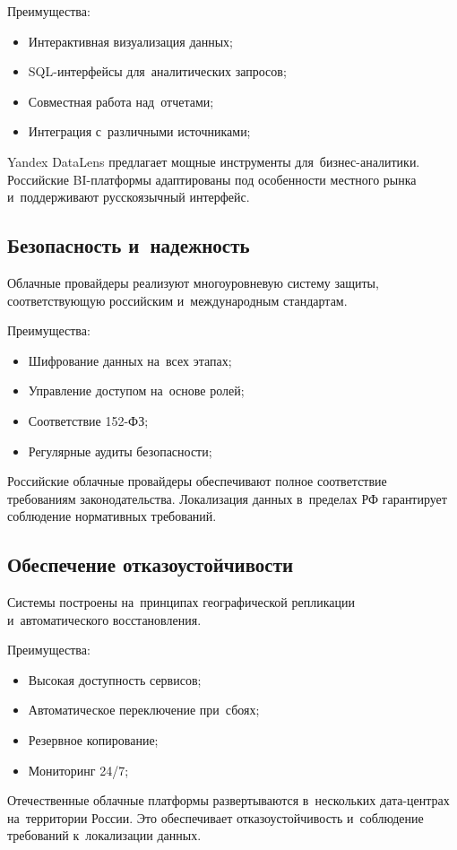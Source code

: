 \documentclass{ou}
\begin{document}
Преимущества:
\begin{itemize}[label=-, leftmargin=0em, itemindent=3.35em, nosep]
\item Интерактивная визуализация данных;
\item SQL-интерфейсы для~аналитических запросов;
\item Совместная работа над~отчетами;
\item Интеграция с~различными источниками;
\end{itemize}

Yandex DataLens предлагает мощные инструменты для~бизнес-аналитики. Российские BI-платформы адаптированы под особенности местного рынка и~поддерживают русскоязычный интерфейс.
\subsection{Безопасность и~надежность}
Облачные провайдеры реализуют многоуровневую систему защиты, соответствующую российским и~международным стандартам.

Преимущества:
\begin{itemize}[label=-, leftmargin=0em, itemindent=3.35em, nosep]
\item Шифрование данных на~всех этапах;
\item Управление доступом на~основе ролей;
\item Соответствие 152-ФЗ;
\item Регулярные аудиты безопасности;
\end{itemize}

Российские облачные провайдеры обеспечивают полное соответствие требованиям законодательства. Локализация данных в~пределах РФ гарантирует соблюдение нормативных требований.
\subsection{Обеспечение отказоустойчивости}
Системы построены на~принципах географической репликации и~автоматического восстановления.

Преимущества:
\begin{itemize}[label=-, leftmargin=0em, itemindent=3.35em, nosep]
\item Высокая доступность сервисов;
\item Автоматическое переключение при~сбоях;
\item Резервное копирование;
\item Мониторинг 24/7;
\end{itemize}

Отечественные облачные платформы развертываются в~нескольких дата-центрах на~территории России. Это обеспечивает отказоустойчивость и~соблюдение требований к~локализации данных.
\newpage
{
\sloppy
\nocite{*}


}
\end{document}
